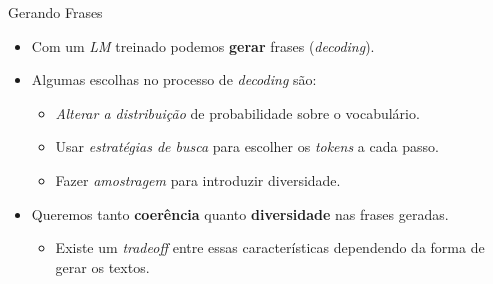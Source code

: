 \documentclass[aspectratio=169,xcolor=dvipsnames]{beamer}
\begin{document}
\begin{frame}{Gerando Frases}
\begin{itemize}
    \item Com um \textit{LM} treinado podemos \textbf{gerar} frases (\textit{decoding}).
    \item Algumas escolhas no processo de \textit{decoding} são:  
    \begin{itemize}
        \item  \textit{Alterar a distribuição} de probabilidade sobre o vocabulário.
        \item Usar \textit{estratégias de busca} para escolher os \textit{tokens} a cada passo.
        \item Fazer \textit{amostragem} para introduzir diversidade.
    \end{itemize}
    \item Queremos tanto \textcolor{red!70!black}{\textbf{coerência}} quanto \textcolor{PastelBlue2}{\textbf{diversidade}} nas frases geradas.
    \begin{itemize}
        \item Existe um \textit{tradeoff} entre essas características dependendo da forma de gerar os textos.
    \end{itemize}
\end{itemize}
\end{frame}
\end{document}
